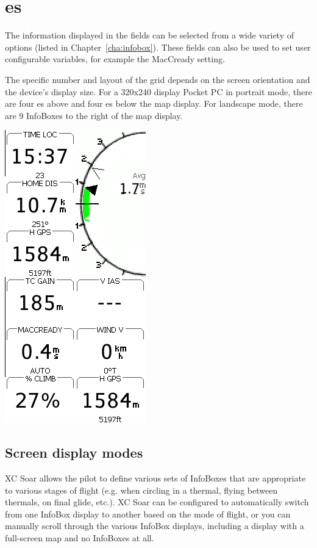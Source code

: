 \section{{\InfoBox}es}

The information displayed in the {\InfoBox} fields can be selected from a
wide variety of options (listed in Chapter~\ref{cha:infobox}). These
fields can also be used to set user configurable variables, for example
the MacCready setting.

The specific number and layout of the {\InfoBox} grid depends on the
screen orientation and the device's display size.  For a 320x240 display
Pocket PC in portrait mode, there are four {\InfoBox}es above and four
{\InfoBox}es below the map display. For landscape mode, there are 9
InfoBoxes to the right of the map display.

\begin{center}
\includegraphics[angle=0,width=0.35\linewidth,keepaspectratio='true']{figures/infoboxes.png}
\end{center}

\subsection*{Screen display modes}

XC Soar allows the pilot to define various sets of InfoBoxes that are appropriate to various stages of flight (e.g. when circling in a thermal, flying between thermals, on final glide, etc.). XC Soar can be configured to automatically switch from one InfoBox display to another based on the mode of flight, or you can manually scroll through the various InfoBox displays, including a display with a full-screen map and no InfoBoxes at all.

